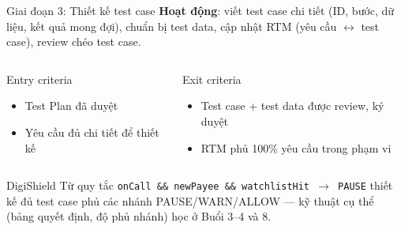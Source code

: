 \documentclass[aspectratio=169,12pt]{beamer}
\begin{document}
\begin{frame}{Giai đoạn 3: Thiết kế test case}
  \textbf{Hoạt động}: viết test case chi tiết (ID, bước, dữ liệu, kết quả mong đợi),
  chuẩn bị test data, cập nhật RTM (yêu cầu $\leftrightarrow$ test case),
  review chéo test case.

  \vspace{0.4em}
  \begin{columns}[T]
    \begin{block}{Entry criteria}
      \begin{itemize}
        \item Test Plan đã duyệt
        \item Yêu cầu đủ chi tiết để thiết kế
      \end{itemize}
    \end{block}
    \begin{block}{Exit criteria}
      \begin{itemize}
        \item Test case + test data được review, ký duyệt
        \item RTM phủ 100\% yêu cầu trong phạm vi
      \end{itemize}
    \end{block}
  \end{columns}

  \vspace{0.3em}
  \begin{exampleblock}{\small DigiShield}
    \small Từ quy tắc \texttt{onCall \&\& newPayee \&\& watchlistHit $\to$ PAUSE}
    thiết kế đủ test case phủ các nhánh PAUSE/WARN/ALLOW --- kỹ thuật cụ thể
    (bảng quyết định, độ phủ nhánh) học ở Buổi 3--4 và 8.
  \end{exampleblock}
\end{frame}
\end{document}
